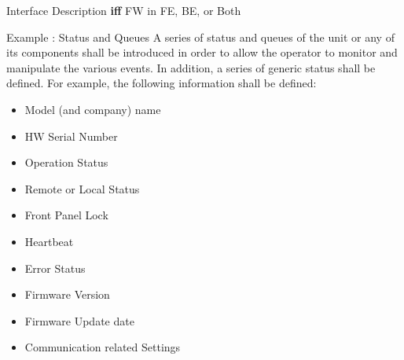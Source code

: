 \documentclass[
  9pt
  , table
  , ignorenonframetext
]{beamer}
\begin{document}
  


\begin{frame}{Interface Description \textbf{iff} FW in FE, BE, or Both}
  \begin{exampleblock}{Example : Status and Queues}
  A series of status and queues of the unit or any of its components shall be introduced in order to allow the operator to monitor and manipulate the various events. In addition, a series of generic status shall be defined. For example, the following information shall be defined:
  \begin{itemize}
  \item Model (and company) name
  \item HW Serial Number
  \item  Operation Status
  \item  Remote or Local Status
  \item  Front Panel Lock
  \item  Heartbeat
  \item  Error Status
  \item  Firmware Version
  \item  Firmware Update date
  \item  Communication related Settings
  \end{itemize}
\end{exampleblock}
\end{frame}
\end{document}
